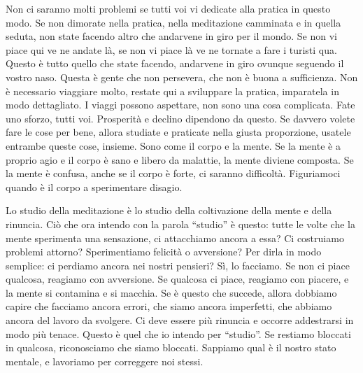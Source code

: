 Non ci saranno molti problemi se tutti voi vi dedicate alla pratica in
questo modo. Se non dimorate nella pratica, nella meditazione camminata
e in quella seduta, non state facendo altro che andarvene in giro per il
mondo. Se non vi piace qui ve ne andate là, se non vi piace là ve ne
tornate a fare i turisti qua. Questo è tutto quello che state facendo,
andarvene in giro ovunque seguendo il vostro naso. Questa è gente che
non persevera, che non è buona a sufficienza. Non è necessario viaggiare
molto, restate qui a sviluppare la pratica, imparatela in modo
dettagliato. I viaggi possono aspettare, non sono una cosa complicata.
Fate uno sforzo, tutti voi. Prosperità e declino dipendono da questo. Se
davvero volete fare le cose per bene, allora studiate e praticate nella
giusta proporzione, usatele entrambe queste cose, insieme. Sono come il
corpo e la mente. Se la mente è a proprio agio e il corpo è sano e
libero da malattie, la mente diviene composta. Se la mente è confusa,
anche se il corpo è forte, ci saranno difficoltà. Figuriamoci quando è
il corpo a sperimentare disagio.

Lo studio della meditazione è lo studio della coltivazione della mente e
della rinuncia. Ciò che ora intendo con la parola ``studio'' è questo:
tutte le volte che la mente sperimenta una sensazione, ci attacchiamo
ancora a essa? Ci costruiamo problemi attorno? Sperimentiamo felicità o
avversione? Per dirla in modo semplice: ci perdiamo ancora nei nostri
pensieri? Sì, lo facciamo. Se non ci piace qualcosa, reagiamo con
avversione. Se qualcosa ci piace, reagiamo con piacere, e la mente si
contamina e si macchia. Se è questo che succede, allora dobbiamo capire
che facciamo ancora errori, che siamo ancora imperfetti, che abbiamo
ancora del lavoro da svolgere. Ci deve essere più rinuncia e occorre
addestrarsi in modo più tenace. Questo è quel che io intendo per
``studio''. Se restiamo bloccati in qualcosa, riconosciamo che siamo
bloccati. Sappiamo qual è il nostro stato mentale, e lavoriamo per
correggere noi stessi.

